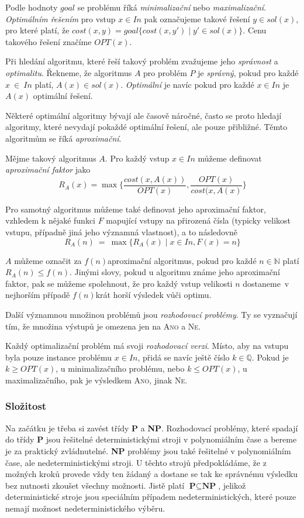 \documentclass[
  printversion=false,
  joinlists=true,
  glossaries=true,
  figures=true,
  tables=true,
  sourcecodes=false,
  theorems=false,
  bibencoding=utf8,
  language=czech,
  encoding=utf8,
  program=infpvs,
  index=true,
  biblatex=true
]{kidiplom}
\begin{document}
Podle hodnoty $goal$ se problému říká \textit{minimalizační} nebo \textit{maximalizační}. \textit{Optimálním řešením} pro vstup $x \in In$ pak označujeme takové řešení $y \in sol(x)$, pro které platí, že $cost(x, y) = goal\{cost(x, y') \mid y' \in sol(x)\}$. Cenu takového řešení značíme $OPT(x)$.

\sloppy Při hledání algoritmu, které řeší takový problém zvažujeme jeho \textit{správnost} a \textit{optimalitu}. Řekneme, že algoritmus $A$ pro problém $P$ je \textit{správný}, pokud pro každé $x~\in~In$ platí, $A(x) \in sol(x)$. \textit{Optimální} je navíc pokud pro každé $x \in In$ je $A(x)$ optimální řešení.

\sloppy Některé optimální algoritmy bývají ale časově náročné, často se proto hledají algoritmy, které nevydají pokaždé optimální řešení, ale pouze přibližné. Těmto algoritmům se říká \textit{aproximační}.

Mějme takový algoritmus $A$. Pro každý vstup $x \in In$ můžeme definovat \textit{aproximační faktor} jako $$R_A(x) = \max\{\frac{cost(x, A(x))}{OPT(x)},\frac{OPT(x)}{cost(x, A(x)}\}$$

Pro samotný algoritmus můžeme také definovat jeho aproximační faktor, vzhledem k nějaké funkci $F$ mapující vstupy na přirozená čísla (typicky velikost vstupu, případně jiná jeho významná vlastnost), a to následovně $$R_A(n)~=~\max\{R_A(x) \mid x \in In, F(x) = n\}$$

$A$ můžeme označit za $f(n)$\textendash aproximační algoritmus, pokud pro každé $n \in \mathbb{N}$ platí $R_A(n) \le f(n)$. Jinými slovy, pokud u algoritmu známe jeho aproximační faktor, pak se můžeme spolehnout, že pro každý vstup velikosti $n$ dostaneme~v nejhorším případě $f(n)$\textendash krát horší výsledek vůči optimu.
\newline

Další významnou množinou problémů jsou \textit{rozhodovací problémy}. Ty se vyznačují tím, že množina výstupů je omezena jen na \textsc{Ano} a \textsc{Ne}.

Každý optimalizační problém má svoji \textit{rozhodovací verzi}. Místo, aby na vstupu byla pouze instance problému $x \in In$, přidá se navíc ještě číslo $k \in \mathbb{Q}$. Pokud je $k \ge OPT(x)$, u minimalizačního problému, nebo $k \le OPT(x)$, u maximalizačního, pak je výsledkem \textsc{Ano}, jinak \textsc{Ne}.

\subsubsection{Složitost} \label{chapter:slozitost}
Na začátku je třeba si zavést třídy \textbf{P} a \textbf{NP}. Rozhodovací problémy, které spadají do třídy \textbf{P} jsou řešitelné deterministickými stroji v polynomiálním čase a bereme je za praktický zvládnutelné. \textbf{NP} problémy jsou také řešitelné v polynomiálním čase, ale nedeterministickými stroji. U těchto strojů předpokládáme, že z možných kroků provede vždy ten žádaný a dostane se tak ke správnému výsledku bez nutnosti zkoušet všechny možnosti. Jistě platí $\textbf{P} \subseteq \textbf{NP}$, jelikož deterministické stroje jsou speciálním případem nedeterministických, které pouze nemají možnost nedeterministického výběru.
\end{document}
